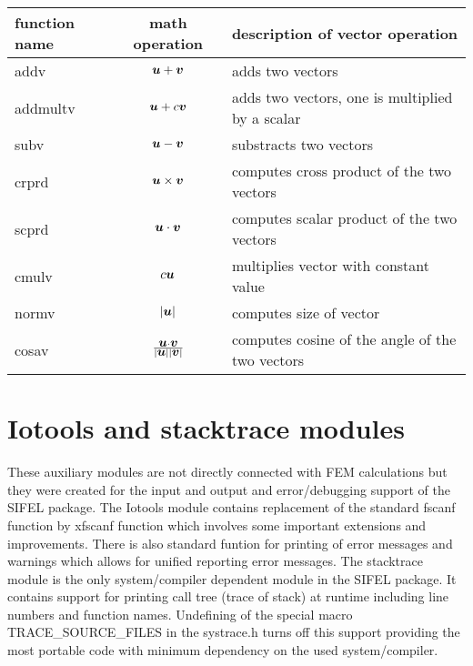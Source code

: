 \begin{center}
\begin{tabular}{|l|c|l|}
\hline
function name  & math operation & description of vector operation
\\ \hline \hline
{\sf addv} & ${\mbox{\boldmath$u$} + \mbox{\boldmath$v$}}$ & adds two vectors
\\ \hline
{\sf addmultv} & ${\mbox{\boldmath$u$} + c \mbox{\boldmath$v$}}$ & adds two vectors, one is multiplied by a scalar
\\ \hline
{\sf subv} & ${\mbox{\boldmath$u$} - \mbox{\boldmath$v$}}$ & substracts two vectors
\\ \hline
{\sf crprd} & ${\mbox{\boldmath$u$} \times \mbox{\boldmath$v$}}$ & computes cross product of the two vectors
\\ \hline
{\sf scprd} & ${\mbox{\boldmath$u$} \cdot \mbox{\boldmath$v$}}$ & computes scalar product of the two vectors
\\ \hline
{\sf cmulv} & $c \mbox{\boldmath$u$} $ & multiplies vector with constant value
\\ \hline
{\sf normv} & $|\mbox{\boldmath$u$} |$ & computes size of vector
\\ \hline
{\sf cosav} & $\frac{\mbox{\boldmath$u$} \cdot \mbox{\boldmath$v$}}{|\mbox{\boldmath$u$}||\mbox{\boldmath$v$}|}$ & computes cosine of the angle of the two vectors
\\ \hline
\end{tabular}
\end{center}


\chapter {Iotools and stacktrace modules}
These auxiliary modules are not directly connected with FEM calculations but they were
created for the input and output and error/debugging support of the SIFEL package. The Iotools module
contains replacement of the standard fscanf function by {\sf xfscanf} function which involves some important 
extensions and improvements. There is also standard funtion for printing of error messages and warnings which
allows for unified reporting error messages. The stacktrace module is the only system/compiler dependent 
module in the SIFEL package. It contains support for printing call tree (trace of stack) at runtime including
line numbers and function names. Undefining of the special macro {\sf TRACE\_SOURCE\_FILES} in the {\sf systrace.h} 
turns off this support providing the most portable code with minimum dependency on the used system/compiler. 

